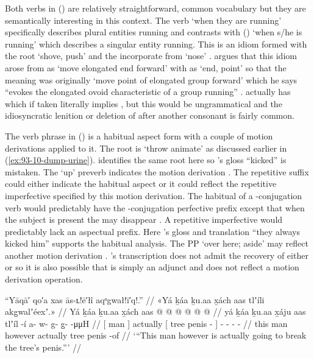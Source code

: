 Both verbs in (\lastx) are relatively straightforward, common vocabulary but they are semantically interesting in this context.
The verb  ‘when they are running’ specifically describes plural entities running and contrasts with  () ‘when s/he is running’ which describes a singular entity running.
This is an idiom formed with the root  ‘shove, push’ and the incorporate  from  ‘nose’ \parencites[f05/180–182]{leer:1973}[674–677]{leer:1976}.
\citeauthor{leer:1991} argues that this idiom arose from  as ‘move elongated end forward’ with  as ‘end, point’ so that the meaning was originally ‘move point of elongated group forward’ which he says “evokes the elongated ovoid characteristic of a group running” \parencite[51]{leer:1991}.
\citeauthor{swanton:1909} actually has  which if taken literally implies , but this would be ungrammatical and the idiosyncratic lenition or deletion of  after another consonant is fairly common.

The verb phrase  in (\lastx) is a habitual aspect form with a couple of motion derivations applied to it.
The root is  ‘throw animate’ as discussed earlier in (\ref{ex:93-10-dump-urine}).
\textcite[149]{boas:1917} identifies the same root here so \citeauthor{swanton:1909}’s gloss “kicked” is mistaken.
The  ‘up’ preverb indicates the motion derivation .
The  repetitive suffix could either indicate the habitual aspect or it could reflect the repetitive imperfective specified by this motion derivation.
The habitual of a -conjugation verb would predictably have the -conjugation perfective prefix  except that when the  subject is present the  may disappear \parencite[110]{leer:1991}.
A repetitive imperfective would predictably lack an aspectual prefix.
Here \citeauthor{swanton:1909}’s gloss and translation “they always kicked him” supports the habitual analysis.
The PP  ‘over here; aside’ may reflect another motion derivation .
\citeauthor{swanton:1909}’s transcription does not admit the recovery of either  or  so it is also possible that  is simply an adjunct and does not reflect a motion derivation operation.

\ex\label{ex:93-18-break-trees-penis}%
%
\begingl
	\glpreamble	“Yāqā′ qo′a xas ās-ʟ!ē′łî aqᵒgwał!ī′q!.” //
	\glpreamble	«\!Yá ḵáa ḵu.aa x̱ách aas tlʼíli akg̱walʼéexʼ.\!» //
	\gla	{} Yá ḵáa {} ḵu.aa x̱ách
		{} aas  @ {} {}
		 @ {} @ {} @ {} @ {} @ {} //
	\glb	{} yá ḵáa {} ḵu.aa x̱áju
		{} aas tlʼíl -í {}
		a- w- g- g̱-  -μμH //
	\glc	{}[  man {}]  actually
		{}[ tree penis - {}]
		- - -   - //
	\gld	{} this man {} however actually
		{} tree penis -of {}
		 {} {} {} {} {} //
	\glft	‘“This man however is actually going to break the tree’s penis.”’
		//
\endgl
\xe

